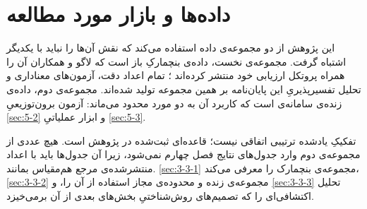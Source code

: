 
\section{داده‌ها و بازار مورد مطالعه}
\label{sec:3-3}

این پژوهش از دو مجموعه‌ی داده استفاده می‌کند که نقش آن‌ها را نباید با یکدیگر اشتباه
گرفت. مجموعه‌ی نخست، داده‌ی بنچمارکِ باز  است که لاگو و همکاران آن را همراه
پروتکل ارزیابی خود منتشر کرده‌اند \cite{lago_forecasting_2021}؛ تمام اعداد دقت،
آزمون‌های معناداری و تحلیل تفسیرپذیریِ این پایان‌نامه بر همین مجموعه تولید شده‌اند.
مجموعه‌ی دوم، داده‌ی زنده‌ی سامانه‌ی  است که کاربرد آن به دو مورد محدود
می‌ماند: آزمون برون‌توزیعیِ \cref{sec:5-2} و ابزار عملیاتیِ \cref{sec:5-3}.

تفکیکِ یادشده ترتیبی اتفاقی نیست؛ قاعده‌ای ثبت‌شده در پژوهش است. هیچ عددی از مجموعه‌ی دوم
وارد جدول‌های نتایج فصل چهارم نمی‌شود، زیرا آن جدول‌ها باید با اعداد منتشرشده‌ی مرجع
هم‌مقیاس بمانند. \cref{sec:3-3-1} مجموعه‌ی بنچمارک را معرفی می‌کند، \cref{sec:3-3-2} مجموعه‌ی زنده و
محدوده‌ی مجاز استفاده از آن را، و \cref{sec:3-3-3} تحلیل اکتشافی‌ای را که تصمیم‌های
روش‌شناختیِ بخش‌های بعدی از آن برمی‌خیزد.
